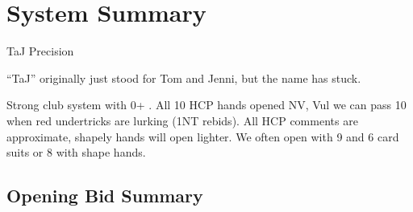 \documentclass[main]{subfile}
\begin{document}
	\chapter{System Summary}
	
	\Large
	\begin{center}
		TaJ Precision
	\end{center}

	\normalsize
	
	``TaJ'' originally just stood for Tom and Jenni, but the name has stuck.
	
	Strong club system with 0+ .  All 10 HCP hands opened NV, Vul we can pass 10 when red undertricks are lurking (1NT rebids). All HCP comments are approximate, shapely hands will open lighter.  We often open with 9 and 6 card suits or 8 with shape hands.
	
	\section{Opening Bid Summary}
	
\end{document}
